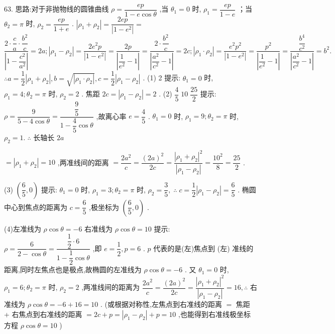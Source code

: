 63. 思路:对于非抛物线的圆锥曲线 $\rho  = \dfrac{ep}{1 - e\cos \theta }$ ,当 ${\theta }_{1} = 0$ 时, ${\rho }_{1} = \dfrac{ep}{1 - e}$ ；当 ${\theta }_{2} = \pi$ 时, ${\rho }_{2} = \dfrac{ep}{1 + e}$ . $\left| {{\rho }_{1} + {\rho }_{2}}\right|  = \dfrac{2ep}{\left| 1 - {e}^{2}\right| } =$  $\dfrac{2 \cdot  \dfrac{c}{a} \cdot  \dfrac{{b}^{2}}{c}}{\left| 1 - \dfrac{{c}^{2}}{{a}^{2}}\right| } = {2a};\left| {{\rho }_{1} - {\rho }_{2}}\right|  = \dfrac{2{e}^{2}p}{\left| 1 - {e}^{2}\right| } = \dfrac{2p}{\left| \dfrac{1}{{e}^{2}} - 1\right| } = \dfrac{2 \cdot  \dfrac{{b}^{2}}{c}}{\left| \dfrac{{a}^{2}}{{c}^{2}} - 1\right| } = {2c};\left| {{\rho }_{1} \cdot  {\rho }_{2}}\right|  = \dfrac{{e}^{2}{p}^{2}}{\left| 1 - {e}^{2}\right| } = \dfrac{{p}^{2}}{\left| \dfrac{1}{{e}^{2}} - 1\right| } = \dfrac{\dfrac{{b}^{4}}{{c}^{2}}}{\left| \dfrac{{a}^{2}}{{c}^{2}} - 1\right| } = {b}^{2}.$  $\therefore a = \dfrac{1}{2}\left| {{\rho }_{1} + {\rho }_{2}}\right| ,b = \sqrt{\left| {\rho }_{1} \cdot  {\rho }_{2}\right| },c = \dfrac{1}{2}\left| {{\rho }_{1} - {\rho }_{2}}\right|$ . (1) 2 提示: ${\theta }_{1} = 0$ 时, ${\rho }_{1} = 4;{\theta }_{2} = \pi$ 时, ${\rho }_{2} = 2$ . 焦距 ${2c} = \left| {{\rho }_{1} - {\rho }_{2}}\right|  = 2$ . (2) $\dfrac{4}{5}\;{10}\;\dfrac{25}{2}$ 提示: $\rho  = \dfrac{9}{5 - 4\cos \theta } = \dfrac{\dfrac{9}{5}}{1 - \dfrac{4}{5}\cos \theta }$ ,故离心率 $e = \dfrac{4}{5}$ . ${\theta }_{1} = 0$ 时, ${\rho }_{1} = 9;{\theta }_{2} = \pi$ 时, ${\rho }_{2} = 1.\;\therefore$ 长轴长 ${2a}$

$= \left| {{\rho }_{1} + {\rho }_{2}}\right|  = {10}$ ,两准线间的距离 $= \dfrac{2{a}^{2}}{c} = \dfrac{{\left( 2a\right) }^{2}}{2c} = \dfrac{{\left| {\rho }_{1} + {\rho }_{2}\right| }^{2}}{\left| {\rho }_{1} - {\rho }_{2}\right| } = \dfrac{{10}^{2}}{8} = \dfrac{25}{2}$ .

(3) $\left( {\dfrac{6}{5},0}\right)$ 提示: ${\theta }_{1} = 0$ 时, ${\rho }_{1} = 3;{\theta }_{2} = \pi$ 时, ${\rho }_{2} = \dfrac{3}{5},\;\therefore \;c = \dfrac{1}{2}\left| {{\rho }_{1} - {\rho }_{2}}\right|  = \dfrac{6}{5}$ . 椭圆中心到焦点的距离为 $c = \dfrac{6}{5}$ ,极坐标为 $\left( {\dfrac{6}{5},0}\right)$ .

(4)左准线为 $\rho \cos \theta  =  - 6$ 右准线为 $\rho \cos \theta  = {10}$ 提示: $\rho  = \dfrac{6}{2 - \cos \theta } = \dfrac{\dfrac{1}{2} \cdot  6}{1 - \dfrac{1}{2}\cos \theta }$ ,即 $e = \dfrac{1}{2},p = 6$ . $p$ 代表的是(左)焦点到 (左) 准线的距离,同时左焦点也是极点,故椭圆的左准线为 $\rho \cos \theta  =  - 6$ . 又 ${\theta }_{1} = 0$ 时, ${\rho }_{1} = 6;{\theta }_{2} = \pi$ 时, ${\rho }_{2} = 2$ ,两准线间的距离为 $\dfrac{2{a}^{2}}{c} = \dfrac{{\left( 2a\right) }^{2}}{2c} = \dfrac{{\left| {\rho }_{1} + {\rho }_{2}\right| }^{2}}{\left| {\rho }_{1} - {\rho }_{2}\right| } = {16},\therefore$ 右准线为 $\rho \cos \theta  =  - 6 + {16} = {10}$ . (或根据对称性,左焦点到右准线的距离 $=$ 焦距 + 右焦点到右准线的距离 $= {2c} + p = \left| {{\rho }_{1} - {\rho }_{2}}\right|  + p = {10}$ ,也能得到右准线极坐标方程 $\rho \cos \theta  = {10}$ )

